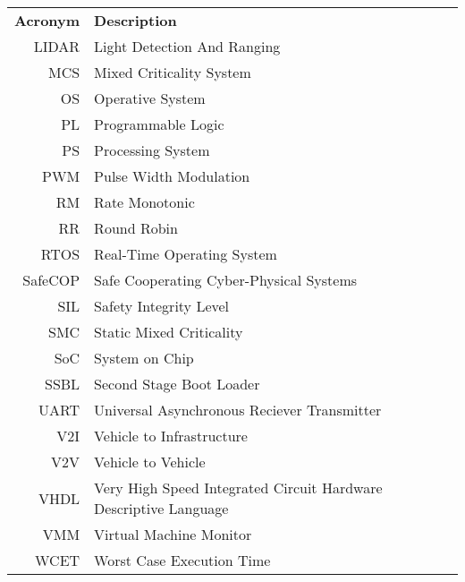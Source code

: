 \begin{tabular}{r l}
\textbf{Acronym} 	& \textbf{Description} \vspace{.5em} \\
LIDAR				&Light Detection And Ranging\\
MCS					&Mixed Criticality System\\
OS					&Operative System\\
PL					&Programmable Logic\\
PS					&Processing System\\
PWM					&Pulse Width Modulation\\
RM					&Rate Monotonic\\
RR					&Round Robin\\
RTOS				&Real-Time Operating System\\
SafeCOP				&Safe Cooperating Cyber-Physical Systems\\
SIL					&Safety Integrity Level\\
SMC					&Static Mixed Criticality\\
SoC					&System on Chip\\
SSBL				&Second Stage Boot Loader\\
UART				&Universal Asynchronous Reciever Transmitter\\
V2I					&Vehicle to Infrastructure\\
V2V					&Vehicle to Vehicle\\
VHDL				&Very High Speed Integrated Circuit Hardware Descriptive Language\\
VMM					&Virtual Machine Monitor\\
WCET				&Worst Case Execution Time\\
\end{tabular}
\resumetocwriting